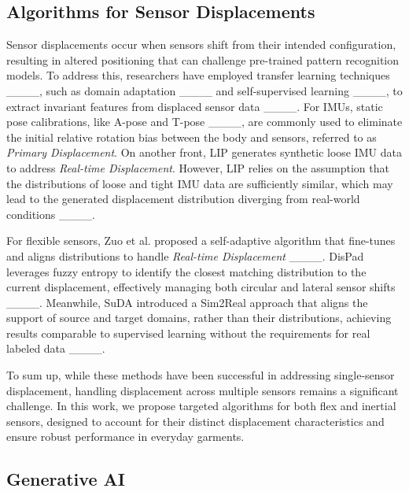 \subsection{Algorithms for Sensor Displacements}
Sensor displacements occur when sensors shift from their intended configuration, resulting in altered positioning that can challenge pre-trained pattern recognition models. To address this, researchers have employed transfer learning techniques ____, such as domain adaptation ____ and self-supervised learning ____, to extract invariant features from displaced sensor data ____. For IMUs, static pose calibrations, like A-pose and T-pose ____, are commonly used to eliminate the initial relative rotation bias between the body and sensors, referred to as \textit{Primary Displacement}. On another front, LIP generates synthetic loose IMU data to address \textit{Real-time Displacement}. However, LIP relies on the assumption that the distributions of loose and tight IMU data are sufficiently similar, which may lead to the generated displacement distribution diverging from real-world conditions ____.

For flexible sensors, Zuo et al. proposed a self-adaptive algorithm that fine-tunes and aligns distributions to handle \textit{Real-time Displacement} ____. DisPad leverages fuzzy entropy to identify the closest matching distribution to the current displacement, effectively managing both circular and lateral sensor shifts ____. Meanwhile, SuDA introduced a Sim2Real approach that aligns the support of source and target domains, rather than their distributions, achieving results comparable to supervised learning without the requirements for real labeled data ____.

To sum up, while these methods have been successful in addressing single-sensor displacement, handling displacement across multiple sensors remains a significant challenge. In this work, we propose targeted algorithms for both flex and inertial sensors, designed to account for their distinct displacement characteristics and ensure robust performance in everyday garments.

\subsection{Generative AI}



